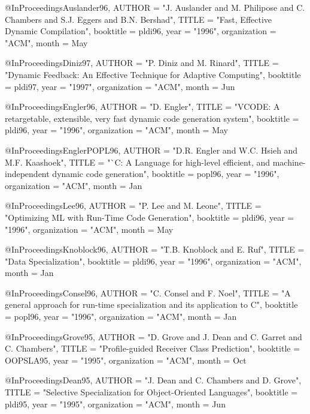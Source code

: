 @InProceedings{Auslander96,
        AUTHOR = "J. Auslander and M. Philipose and C. Chambers and
		  S.J. Eggers and B.N. Bershad",
        TITLE = "Fast, Effective Dynamic Compilation",
        booktitle = pldi96,
        year =   "1996",
        organization = "ACM",
        month = May
}

@InProceedings{Diniz97,
        AUTHOR = "P. Diniz and M. Rinard",
        TITLE = "Dynamic Feedback: An Effective Technique for Adaptive Computing",
        booktitle = pldi97,
        year =   "1997",
        organization = "ACM",
        month = Jun
}

@InProceedings{Engler96,
        AUTHOR = "D. Engler",
        TITLE = "VCODE: A retargetable, extensible, very fast dynamic
		  code generation system",
        booktitle = pldi96,
        year =   "1996",
        organization = "ACM",
        month = May
}


@InProceedings{EnglerPOPL96,
        AUTHOR = "D.R. Engler and W.C. Hsieh and M.F. Kaashoek",
        TITLE = "`{C}: A Language for high-level efficient, and
		  machine-independent dynamic code generation",
        booktitle = popl96,
        year =   "1996",
        organization = "ACM",
        month = Jan
}

@InProceedings{Lee96,
        AUTHOR = "P. Lee and M. Leone",
        TITLE = "Optimizing ML with Run-Time Code Generation",
        booktitle = pldi96,
        year =   "1996",
        organization = "ACM",
        month = May
}

@InProceedings{Knoblock96,
        AUTHOR = "T.B. Knoblock and E. Ruf",
        TITLE = "Data Specialization",
        booktitle = pldi96,
        year =   "1996",
        organization = "ACM",
        month = Jan
}

@InProceedings{Consel96,
        AUTHOR = "C. Consel and F. Noel",
        TITLE = "A general approach for run-time specialization and
		  its application to {C}",
        booktitle = popl96,
        year =   "1996",
        organization = "ACM",
        month = Jan
}



@InProceedings{Grove95,
        AUTHOR = "D. Grove and J. Dean and C. Garret and C. Chambers",
        TITLE = "Profile-guided Receiver Class Prediction",
        booktitle = OOPSLA95,
        year =   "1995",
        organization = "ACM",
        month = Oct
}

@InProceedings{Dean95,
        AUTHOR = "J. Dean and C. Chambers and D. Grove",
        TITLE = "Selective Specialization for Object-Oriented Languages",
        booktitle = pldi95,
        year =   "1995",
        organization = "ACM",
        month = Jun
}


